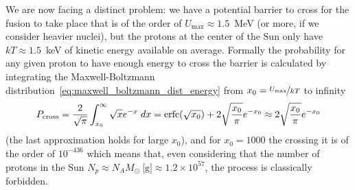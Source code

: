 We are now facing a distinct problem: we have a potential barrier to cross for the fusion
to take place that is of the order of $U_\text{max} \approx 1.5$~MeV (or more, if we
consider heavier nuclei), but the protons at the center of the Sun only have $kT \approx 1.5$~keV
of kinetic energy available on average. Formally the probability for any given proton
to have enough energy to cross the barrier is calculated by integrating the Maxwell-Boltzmann
distribution~\eqref{eq:maxwell_boltzmann_dist_energy} from $x_0 = \nicefrac{U_\text{max}}{kT}$
to infinity
\begin{align*}
  P_\text{cross} = \frac{2}{\sqrt{\pi}} \int_{x_0}^\infty \sqrt{x} e^{-x} \;d{x} =
  \text{erfc}\qty(\sqrt{x_0}) + 2 \sqrt{\frac{x_0}{\pi}} e^{-x_0} \approx
  2 \sqrt{\frac{x_0}{\pi}} e^{-x_0}
\end{align*}
(the last approximation holds for large $x_0$), and for $x_0 = 1000$ the crossing
it is of the order of $10^{-436}$ which means that, even considering that the number of
protons in the Sun $N_p \approx N_A M_\odot~\text{[g]} \approx 1.2 \times 10^{57}$,
the process is classically forbidden.

